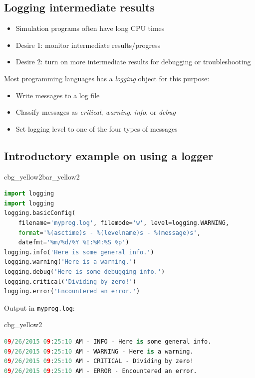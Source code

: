 \documentclass[%
oneside,                 %
final,                   %
10pt]{article}
\newenvironment{_cod_tight}[1]{
   \def\FrameCommand{\colorbox{#1}}
   \FrameRule0.6pt\MakeFramed {\FrameRestore}\vskip3mm}
   {\vskip0mm\endMakeFramed}
\newenvironment{cod}[1]{
\bgroup\rmfamily
\fboxsep=0mm\relax
\begin{_cod_tight}{#1}
\list{}{\parsep=-2mm\parskip=0mm\topsep=0pt\leftmargin=2mm
\rightmargin=2\leftmargin\leftmargin=4pt\relax}
\item\relax}
{\endlist\end{_cod_tight}\egroup}
\newenvironment{_pro_tight}[2]{
   \def\FrameCommand{\color{#2}\vrule width 1mm\normalcolor\colorbox{#1}}
   \FrameRule0.6pt\MakeFramed {\advance\hsize-2mm\FrameRestore}\vskip3mm}
   {\vskip0mm\endMakeFramed}
\newenvironment{pro}[2]{
\bgroup\rmfamily
\fboxsep=0mm\relax
\begin{_pro_tight}{#1}{#2}
\list{}{\parsep=-2mm\parskip=0mm\topsep=0pt\leftmargin=2mm
\rightmargin=2\leftmargin\leftmargin=4pt\relax}
\item\relax}
{\endlist\end{_pro_tight}\egroup}
\begin{document}
\subsection*{Logging intermediate results}
\label{softeng1:basic:logging}

\begin{itemize}
 \item Simulation programs often have long CPU times

 \item Desire 1: monitor intermediate results/progress

 \item Desire 2: turn on more intermediate results for debugging or troubleshooting
\end{itemize}

\noindent
Most programming languages has a \emph{logging} object for this purpose:

\begin{itemize}
 \item Write messages to a log file

 \item Classify messages as \emph{critical}, \emph{warning}, \emph{info}, or \emph{debug}

 \item Set logging level to one of the four types of messages
\end{itemize}

\noindent
\subsection*{Introductory example on using a logger}

\begin{pro}{cbg_yellow2}{bar_yellow2}\begin{lstlisting}[language=Python,style=simple,xleftmargin=2mm]
import logging
import logging
logging.basicConfig(
    filename='myprog.log', filemode='w', level=logging.WARNING,
    format='%(asctime)s - %(levelname)s - %(message)s',
    datefmt='%m/%d/%Y %I:%M:%S %p')
logging.info('Here is some general info.')
logging.warning('Here is a warning.')
logging.debug('Here is some debugging info.')
logging.critical('Dividing by zero!')
logging.error('Encountered an error.')
\end{lstlisting}\end{pro}
\noindent

Output in \texttt{myprog.log}:

\begin{cod}{cbg_yellow2}\begin{lstlisting}[language=Python,style=simple,xleftmargin=2mm]
09/26/2015 09:25:10 AM - INFO - Here is some general info.
09/26/2015 09:25:10 AM - WARNING - Here is a warning.
09/26/2015 09:25:10 AM - CRITICAL - Dividing by zero!
09/26/2015 09:25:10 AM - ERROR - Encountered an error.
\end{lstlisting}\end{cod}
\noindent
\end{document}
